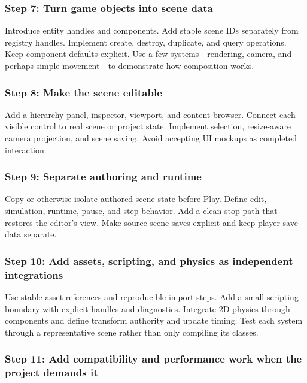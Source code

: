 \subsubsection{Step 7: Turn game objects into scene data}\label{06-engine-ii-ch042-step-7-turn-game-objects-into-scene-data}

Introduce entity handles and components. Add stable scene IDs separately from registry handles. Implement create, destroy, duplicate, and query operations. Keep component defaults explicit. Use a few systems---rendering, camera, and perhaps simple movement---to demonstrate how composition works.

\subsubsection{Step 8: Make the scene editable}\label{06-engine-ii-ch042-step-8-make-the-scene-editable}

Add a hierarchy panel, inspector, viewport, and content browser. Connect each visible control to real scene or project state. Implement selection, resize-aware camera projection, and scene saving. Avoid accepting UI mockups as completed interaction.

\subsubsection{Step 9: Separate authoring and runtime}\label{06-engine-ii-ch042-step-9-separate-authoring-and-runtime}

Copy or otherwise isolate authored scene state before Play. Define edit, simulation, runtime, pause, and step behavior. Add a clean stop path that restores the editor's view. Make source-scene saves explicit and keep player save data separate.

\subsubsection{Step 10: Add assets, scripting, and physics as independent integrations}\label{06-engine-ii-ch042-step-10-add-assets-scripting-and-physics-as-independent-integrations}

Use stable asset references and reproducible import steps. Add a small scripting boundary with explicit handles and diagnostics. Integrate 2D physics through components and define transform authority and update timing. Test each system through a representative scene rather than only compiling its classes.

\subsubsection{Step 11: Add compatibility and performance work when the project demands it}\label{06-engine-ii-ch042-step-11-add-compatibility-and-performance-work-when-the-project-demands-it}

